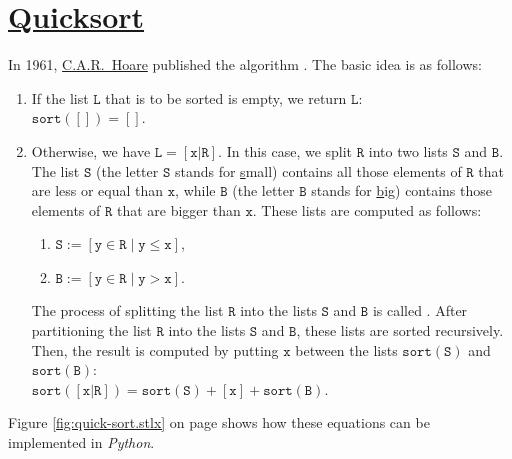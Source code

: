 \section{\href{http://en.wikipedia.org/wiki/Quicksort}{Quicksort}}
In 1961, \href{http://en.wikipedia.org/wiki/Tony_Hoare}{C.A.R.~Hoare} published the
algorithm \cite{hoare:61}.  The basic idea is as follows:
\begin{enumerate}
\item If the list $\mathtt{L}$ that is to be sorted is empty, we return $\mathtt{L}$: 
      \\[0.2cm]
      \hspace*{1.3cm} $\mathtt{sort}([]) = []$.
\item Otherwise, we have $\mathtt{L} = [\mathtt{x}|\mathtt{R}]$.  In this case, we split $\mathtt{R}$ into two lists $\mathtt{S}$ and $\mathtt{B}$.
      The list $\mathtt{S}$ (the letter $\mathtt{S}$ stands for \underline{s}mall) contains all those elements of $\mathtt{R}$ that are less
      or equal than $\mathtt{x}$,     while $\mathtt{B}$ (the letter $\mathtt{B}$ stands for \underline{b}ig) contains
      those elements of $\mathtt{R}$ that are bigger than $\mathtt{x}$.  These lists are computed as follows:
      \begin{enumerate}
      \item $\mathtt{S} := [\mathtt{y} \in \mathtt{R} \mid \mathtt{y} \leq \mathtt{x}]$,
      \item $\mathtt{B} := [\mathtt{y} \in \mathtt{R} \mid \mathtt{y} > \mathtt{x}]$.
      \end{enumerate}
      The process of splitting the list $\mathtt{R}$ into the lists $\mathtt{S}$ and $\mathtt{B}$
      is called .  After partitioning the list $\mathtt{R}$ into the lists $\mathtt{S}$ and $\mathtt{B}$, these lists are sorted
      recursively.  Then, the result is computed by putting $\mathtt{x}$ between the lists $\mathtt{sort}(\mathtt{S})$ and $\mathtt{sort}(\mathtt{B})$:
      \\[0.2cm]
      \hspace*{1.3cm}
      $\mathtt{sort}([\mathtt{x}|\mathtt{R}]) = \mathtt{sort}(\mathtt{S}) + [\mathtt{x}] + \mathtt{sort}(\mathtt{B})$.
\end{enumerate}
Figure \ref{fig:quick-sort.stlx} on page \pageref{fig:quick-sort.stlx} shows how these equations can
be implemented in \textsl{Python}.


